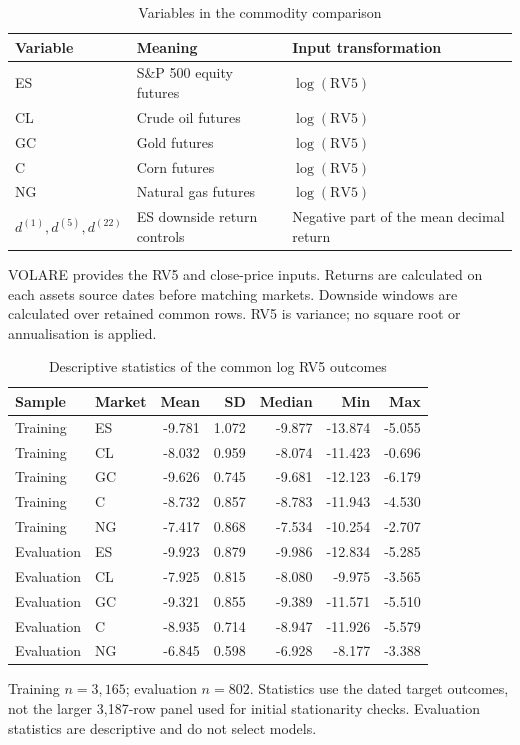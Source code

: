 \documentclass[11pt,letterpaper]{article}
\begin{document}
\begin{table}[H]
\centering
\caption{Variables in the commodity comparison}\label{tab:definitions}
\small
\begin{tabular}{p{0.9in}p{2.6in}p{2.35in}}
\toprule
Variable & Meaning & Input transformation \\
\midrule
ES & S\&P 500 equity futures & $\log(\mathrm{RV5})$ \\
CL & Crude oil futures & $\log(\mathrm{RV5})$ \\
GC & Gold futures & $\log(\mathrm{RV5})$ \\
C & Corn futures & $\log(\mathrm{RV5})$ \\
NG & Natural gas futures & $\log(\mathrm{RV5})$ \\
$d^{(1)},d^{(5)},d^{(22)}$ & ES downside return controls & Negative part of the mean decimal return \\
\bottomrule
\end{tabular}
\end{table}
{\footnotesize VOLARE provides the RV5 and close-price inputs. Returns are calculated on each asset\textquotesingle s source dates before matching markets. Downside windows are calculated over retained common rows. RV5 is variance; no square root or annualisation is applied.\par}

\begin{table}[H]
\centering
\caption{Descriptive statistics of the common log RV5 outcomes}\label{tab:stats}
\footnotesize
\begin{tabular}{llrrrrr}
\toprule
Sample & Market & Mean & SD & Median & Min & Max \\
\midrule
Training & ES & -9.781 & 1.072 & -9.877 & -13.874 & -5.055 \\
Training & CL & -8.032 & 0.959 & -8.074 & -11.423 & -0.696 \\
Training & GC & -9.626 & 0.745 & -9.681 & -12.123 & -6.179 \\
Training & C & -8.732 & 0.857 & -8.783 & -11.943 & -4.530 \\
Training & NG & -7.417 & 0.868 & -7.534 & -10.254 & -2.707 \\
Evaluation & ES & -9.923 & 0.879 & -9.986 & -12.834 & -5.285 \\
Evaluation & CL & -7.925 & 0.815 & -8.080 & -9.975 & -3.565 \\
Evaluation & GC & -9.321 & 0.855 & -9.389 & -11.571 & -5.510 \\
Evaluation & C & -8.935 & 0.714 & -8.947 & -11.926 & -5.579 \\
Evaluation & NG & -6.845 & 0.598 & -6.928 & -8.177 & -3.388 \\
\bottomrule
\end{tabular}
\end{table}
{\footnotesize Training $n=3{,}165$; evaluation $n=802$. Statistics use the dated target outcomes, not the larger 3,187-row panel used for initial stationarity checks. Evaluation statistics are descriptive and do not select models.\par}
\end{document}
